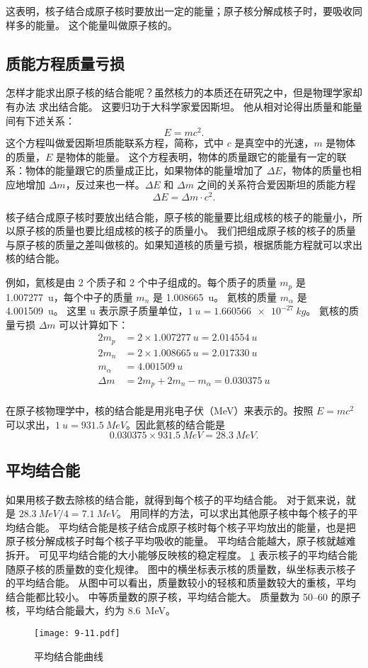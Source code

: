 这表明，核子结合成原子核时要放出一定的能量；原子核分解成核子时，要吸收同样多的能量。
这个能量叫做原子核的。

\subsection{质能方程\texorpdfstring{\quad}{ }质量亏损}

怎样才能求出原子核的结合能呢？虽然核力的本质还在研究之中，但是物理学家却有办法
求出结合能。
这要归功于大科学家爱因斯坦。
他从相对论得出质量和能量间有下述关系：
\[E=mc^2.\]
这个方程叫做爱因斯坦质能联系方程，简称，式中 $c$ 是真空中的光速，$m$ 是物体的质量，$E$ 是物体的能量。
这个方程表明，物体的质量跟它的能量有一定的联系：物体的能量跟它的质量成正比，如果物体的能量增加了 $\Delta E$，物体的质量也相应地增加 $\Delta m$，反过来也一样。$\Delta E$ 和 $\Delta m$ 之间的关系符合爱因斯坦的质能方程
\[\Delta E=\Delta m\cdot c^2.\]

核子结合成原子核时要放出结合能，原子核的能量要比组成核的核子的能量小，所以原子核的质量也要比组成核的核子的质量小。
我们把组成原子核的核子的质量与原子核的质量之差叫做核的。如果知道核的质量亏损，根据质能方程就可以求出核的结合能。

例如，氦核是由 2 个质子和 2 个中子组成的。每个质子的质量 $m_p$ 是 \qty{1.007277}{u}，每个中子的质量 $m_n$ 是 \qty{1.008665}{u}。
氦核的质量 $m_{\alpha}$ 是 \qty{4.001509}{u}。
这里 \unit{u} 表示原子质量单位，$ \qty{1}{u}=\qty{1.660566e-27}{kg}$。
氦核的质量亏损 $\Delta m$ 可以计算如下：
\[\begin{split}
    2m_p&=2\times \qty{1.007277}{u}=\qty{2.014554}{u}\\
    2m_n&=2\times \qty{1.008665}{u}=\qty{2.017330}{u}\\
    m_{\alpha}&= \qty{4.001509}{u}\\
    \Delta m&=2m_p+2m_n-m_{\alpha}=\qty{0.030375}{u}\\
\end{split}\]

在原子核物理学中，核的结合能是用兆电子伏（\unit{MeV}）来表示的。按照 $E=mc^2$ 可以求出，$\qty{1}{u}=\qty{931.5}{MeV}$。因此氦核的结合能是
\[ 0.030375 \times \qty{931.5}{MeV}=\qty{28.3}{MeV}.\]

\subsection{平均结合能} 
如果用核子数去除核的结合能，就得到每个核子的平均结合能。
对于氦来说，就是 $\qty{28.3}{MeV}/4=\qty{7.1}{MeV}$。
用同样的方法，可以求出其他原子核中每个核子的平均结合能。
平均结合能是核子结合成原子核时每个核子平均放出的能量，也是把原子核分解成核子时每个核子平均吸收的能量。
平均结合能越大，原子核就越难拆开。
可见平均结合能的大小能够反映核的稳定程度。
\cref{fig:9-11} 表示核子的平均结合能随原子核的质量数的变化规律。
图中的横坐标表示核的质量数，纵坐标表示核子的平均结合能。
从图中可以看出，质量数较小的轻核和质量数较大的重核，平均结合能都比较小。
中等质量数的原子核，平均结合能大。
质量数为 \numrange{50}{60} 的原子核，平均结合能最大，约为 \qty{8.6}{MeV}。
\begin{figure}
  \texttt{[image: 9-11.pdf]}
  \caption{平均结合能曲线}\label{fig:9-11}
\end{figure}

